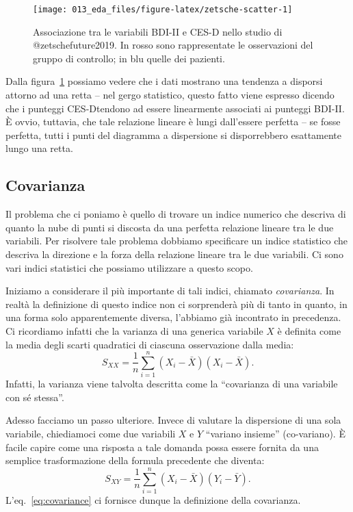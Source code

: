 \documentclass[
  11pt,
  italian,
  a4paper,
  extrafontsizes,onecolumn,openright
  ]{memoir}
\newlength{\rf}
\theoremstyle{definition}
\theoremstyle{definition}
\theoremstyle{definition}
\theoremstyle{definition}
\theoremstyle{remark}
\begin{document}
\begin{figure}[h]

{\centering \texttt{[image: 013\_eda\_files/figure-latex/zetsche-scatter-1]} 

}

\caption{Associazione tra le variabili BDI-II e CES-D nello studio di @zetschefuture2019. In rosso sono rappresentate le osservazioni del gruppo di controllo; in blu quelle dei pazienti.}\label{fig:zetsche-scatter}
\end{figure}

Dalla figura~\ref{fig:zetsche-scatter} possiamo vedere che i dati mostrano una tendenza a disporsi attorno ad una retta -- nel gergo statistico, questo fatto viene espresso dicendo che i punteggi CES-Dtendono ad essere linearmente associati ai punteggi BDI-II. È ovvio, tuttavia, che tale relazione lineare è lungi dall'essere perfetta -- se fosse perfetta, tutti i punti del diagramma a dispersione si disporrebbero esattamente lungo una retta.

\hypertarget{covarianza}{%
\subsection{Covarianza}\label{covarianza}}

Il problema che ci poniamo è quello di trovare un indice numerico che
descriva di quanto la nube di punti si discosta da una perfetta
relazione lineare tra le due variabili. Per risolvere tale problema
dobbiamo specificare un indice statistico che descriva la direzione e la
forza della relazione lineare tra le due variabili. Ci sono vari indici
statistici che possiamo utilizzare a questo scopo.

Iniziamo a considerare il più importante di tali indici, chiamato
\emph{covarianza}. In realtà la definizione di questo indice non ci
sorprenderà più di tanto in quanto, in una forma solo apparentemente
diversa, l'abbiamo già incontrato in precedenza. Ci ricordiamo infatti
che la varianza di una generica variabile \(X\) è definita come la media
degli scarti quadratici di ciascuna osservazione dalla media:
\begin{equation}
S_{XX} = \frac{1}{n} \sum_{i=1}^n(X_i - \bar{X}) (X_i - \bar{X}).
\label{eq:variance2}
\end{equation}
Infatti, la varianza viene talvolta descritta come la ``covarianza di una
variabile con sé stessa''.

Adesso facciamo un passo ulteriore. Invece di valutare la dispersione di
una sola variabile, chiediamoci come due variabili \(X\) e \(Y\) ``variano
insieme'' (co-variano). È facile capire come una risposta a tale domanda
possa essere fornita da una semplice trasformazione della formula
precedente che diventa:
\begin{equation}
S_{XY} = \frac{1}{n} \sum_{i=1}^n(X_i - \bar{X}) (Y_i - \bar{Y}).
\label{eq:covariance}
\end{equation}
L'eq.~\eqref{eq:covariance} ci fornisce dunque la definizione della covarianza.
\end{document}
